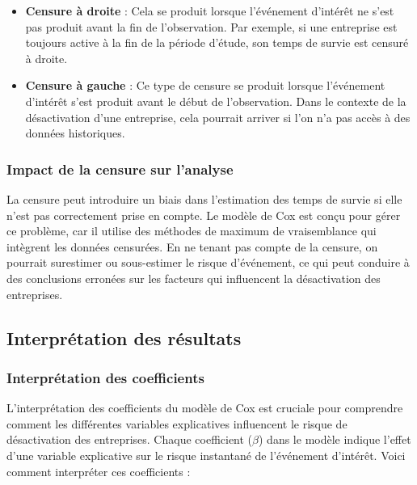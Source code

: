 \documentclass[a4paper,12pt]{report}
\begin{document}
\begin{itemize}
    \item \textbf{Censure à droite} : Cela se produit lorsque l'événement d'intérêt ne s'est pas produit avant la fin de l'observation. Par exemple, si une entreprise est toujours active à la fin de la période d'étude, son temps de survie est censuré à droite.
    \item \textbf{Censure à gauche} : Ce type de censure se produit lorsque l'événement d'intérêt s'est produit avant le début de l'observation. Dans le contexte de la désactivation d'une entreprise, cela pourrait arriver si l'on n'a pas accès à des données historiques.
\end{itemize}

\subsubsection{Impact de la censure sur l'analyse}
La censure peut introduire un biais dans l'estimation des temps de survie si elle n'est pas correctement prise en compte. Le modèle de Cox est conçu pour gérer ce problème, car il utilise des méthodes de maximum de vraisemblance qui intègrent les données censurées. En ne tenant pas compte de la censure, on pourrait surestimer ou sous-estimer le risque d'événement, ce qui peut conduire à des conclusions erronées sur les facteurs qui influencent la désactivation des entreprises.

\subsection{Interprétation des résultats}
\subsubsection{Interprétation des coefficients}
L'interprétation des coefficients du modèle de Cox est cruciale pour comprendre comment les différentes variables explicatives influencent le risque de désactivation des entreprises. Chaque coefficient (\( \beta \)) dans le modèle indique l'effet d'une variable explicative sur le risque instantané de l'événement d'intérêt. Voici comment interpréter ces coefficients :
\end{document}
